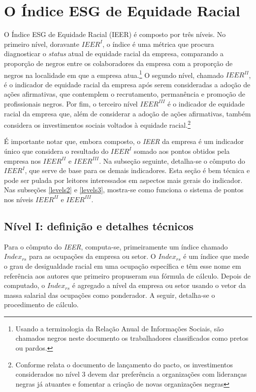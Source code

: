 \documentclass[12pt]{article}
\begin{document}
\section{O Índice ESG de Equidade Racial} \label{ieer_levels}

\par O Índice ESG de Equidade Racial (IEER) é composto por três níveis. No primeiro nível, doravante $IEER^{I}$, o índice é uma métrica que procura diagnosticar o \textit{status} atual de equidade racial da empresa, comparando a proporção de negros entre os colaboradores da empresa com a proporção de negros na localidade em que a empresa atua.\footnote{Usando a terminologia da Relação Anual de Informações Sociais, são chamados negros neste documento os trabalhadores classificados como pretos ou pardos.} O segundo nível, chamado $IEER^{II}$, é o indicador de equidade racial da empresa após serem consideradas a adoção de ações afirmativas, que contemplem o recrutamento, permanência e promoção de profissionais negros. Por fim, o terceiro nível $IEER^{III}$ é o indicador de equidade racial da empresa que, além de considerar a adoção de ações afirmativas, também considera os investimentos sociais voltados à equidade racial.\footnote{Conforme relata o documento de lançamento do pacto, os investimentos considerados no nível 3 devem dar preferência a organizações com lideranças negras já atuantes e fomentar a criação de novas organizações negras}

\par É importante notar que, embora composto, o \textit{IEER} da empresa é um indicador único que considera o resultado do $IEER^{I}$ somado aos pontos obtidos pela empresa nos $IEER^{II}$ e $IEER^{III}$. Na subseção seguinte, detalha-se o cômputo do $IEER^{I}$, que serve de base para os demais indicadores. Esta seção é bem técnica e pode ser pulada por leitores interessados em aspectos mais gerais do indicador. Nas subseções \ref{levels2} e \ref{levels3}, mostra-se como funciona o sistema de pontos nos níveis  $IEER^{II}$ e $IEER^{III}$.

\subsection{Nível I: definição e detalhes técnicos} \label{level1}

\par Para o cômputo do \textit{IEER}, computa-se, primeiramente um índice chamado $Index_{rs}$ para as ocupações da empresa ou setor. O $Index_{rs}$ é um índice que mede o grau de desigualdade racial em uma ocupação específica e têm esse nome em referência aos autores que primeiro propuseram sua fórmula de cálculo.\autocite{ransom2001one} Depois de computado, o $Index_{rs}$ é agregado a nível da empresa ou setor usando o vetor da massa salarial das ocupações como ponderador. A seguir, detalha-se o procedimento de cálculo.
\end{document}
